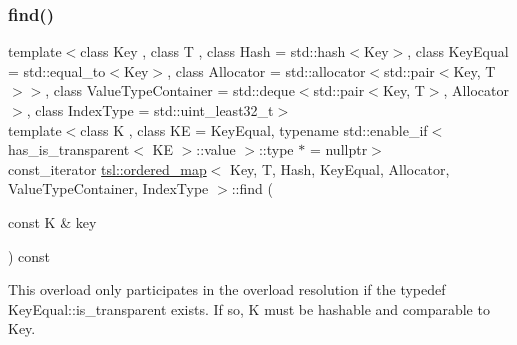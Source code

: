\subsubsection{\texorpdfstring{find()}{find()}\hspace{0.1cm}{\footnotesize\ttfamily [5/6]}}
{\footnotesize\ttfamily template$<$class Key , class T , class Hash  = std\+::hash$<$\+Key$>$, class Key\+Equal  = std\+::equal\+\_\+to$<$\+Key$>$, class Allocator  = std\+::allocator$<$std\+::pair$<$\+Key, T$>$$>$, class Value\+Type\+Container  = std\+::deque$<$std\+::pair$<$\+Key, T$>$, Allocator$>$, class Index\+Type  = std\+::uint\+\_\+least32\+\_\+t$>$ \\
template$<$class K , class KE  = Key\+Equal, typename std\+::enable\+\_\+if$<$ has\+\_\+is\+\_\+transparent$<$ K\+E $>$\+::value $>$\+::type $\ast$  = nullptr$>$ \\
const\+\_\+iterator \mbox{\hyperlink{classtsl_1_1ordered__map}{tsl\+::ordered\+\_\+map}}$<$ Key, T, Hash, Key\+Equal, Allocator, Value\+Type\+Container, Index\+Type $>$\+::find (\begin{DoxyParamCaption}\item[{const K \&}]{key }\end{DoxyParamCaption}) const\hspace{0.3cm}{\ttfamily [inline]}}





This overload only participates in the overload resolution if the typedef Key\+Equal\+::is\+\_\+transparent exists. If so, K must be hashable and comparable to Key. \mbox{\label{classtsl_1_1ordered__map_a1499b8cd1f9ab16341ac65008a26aad8}} 

